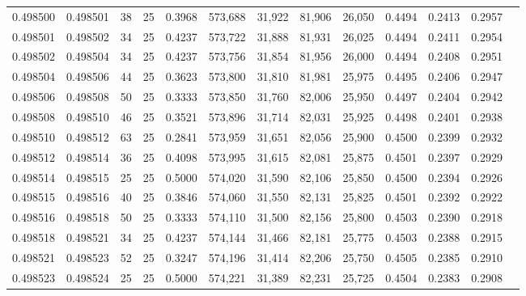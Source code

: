 \begin{tabular}{rrrrrrrrrrrrr}
0.498500 & 0.498501 &    38 &  25 &                                     0.3968 & 573,688 &  31,922 &  81,906 &  26,050 & 0.4494 & 0.2413 & 0.2957 \\
0.498501 & 0.498502 &    34 &  25 &                                     0.4237 & 573,722 &  31,888 &  81,931 &  26,025 & 0.4494 & 0.2411 & 0.2954 \\
0.498502 & 0.498504 &    34 &  25 &                                     0.4237 & 573,756 &  31,854 &  81,956 &  26,000 & 0.4494 & 0.2408 & 0.2951 \\
0.498504 & 0.498506 &    44 &  25 &                                     0.3623 & 573,800 &  31,810 &  81,981 &  25,975 & 0.4495 & 0.2406 & 0.2947 \\
0.498506 & 0.498508 &    50 &  25 &                                     0.3333 & 573,850 &  31,760 &  82,006 &  25,950 & 0.4497 & 0.2404 & 0.2942 \\
0.498508 & 0.498510 &    46 &  25 &                                     0.3521 & 573,896 &  31,714 &  82,031 &  25,925 & 0.4498 & 0.2401 & 0.2938 \\
0.498510 & 0.498512 &    63 &  25 &                                     0.2841 & 573,959 &  31,651 &  82,056 &  25,900 & 0.4500 & 0.2399 & 0.2932 \\
0.498512 & 0.498514 &    36 &  25 &                                     0.4098 & 573,995 &  31,615 &  82,081 &  25,875 & 0.4501 & 0.2397 & 0.2929 \\
0.498514 & 0.498515 &    25 &  25 &                                     0.5000 & 574,020 &  31,590 &  82,106 &  25,850 & 0.4500 & 0.2394 & 0.2926 \\
0.498515 & 0.498516 &    40 &  25 &                                     0.3846 & 574,060 &  31,550 &  82,131 &  25,825 & 0.4501 & 0.2392 & 0.2922 \\
0.498516 & 0.498518 &    50 &  25 &                                     0.3333 & 574,110 &  31,500 &  82,156 &  25,800 & 0.4503 & 0.2390 & 0.2918 \\
0.498518 & 0.498521 &    34 &  25 &                                     0.4237 & 574,144 &  31,466 &  82,181 &  25,775 & 0.4503 & 0.2388 & 0.2915 \\
0.498521 & 0.498523 &    52 &  25 &                                     0.3247 & 574,196 &  31,414 &  82,206 &  25,750 & 0.4505 & 0.2385 & 0.2910 \\
0.498523 & 0.498524 &    25 &  25 &                                     0.5000 & 574,221 &  31,389 &  82,231 &  25,725 & 0.4504 & 0.2383 & 0.2908 \\

\end{tabular}
